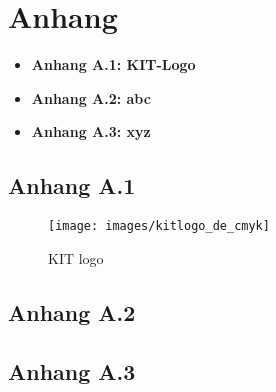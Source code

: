 
\appendix
\captionsetup{list=false}

\section*{Anhang}
\vspace{0.35cm}

\begin{itemize}
	\item \textbf{Anhang A.1: KIT-Logo}\\
	\item \textbf{Anhang A.2: abc}\\
	\item \textbf{Anhang A.3: xyz}\\
	
\end{itemize}

\newpage

\subsection*{Anhang A.1}
\label{sec:Anhang:A.1}
		
\setcounter{figure}{0}
		
\begin{figure}[h]
\centering
\texttt{[image: images/kitlogo\_de\_cmyk]}
\caption{KIT logo}
\label{fig:kit_logo}
\end{figure}

\subsection*{Anhang A.2}
\label{sec:Anhang:A.2}

\subsection*{Anhang A.3}
\label{sec:Anhang:A.3}
